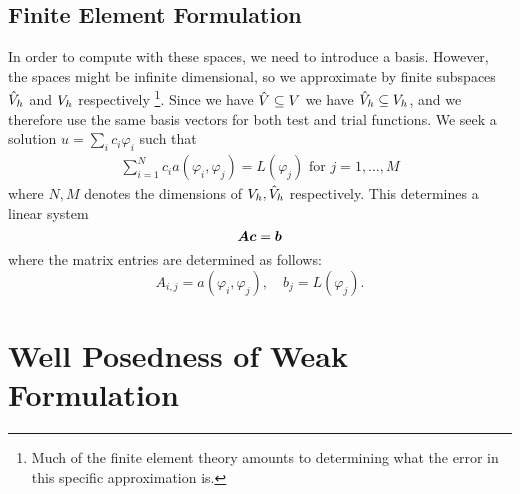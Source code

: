 \subsection{Finite Element Formulation}
\label{sub:finite_element_formulation}

In order to compute with these spaces, we need to introduce a basis. However,
the spaces might be infinite dimensional, so we approximate by finite subspaces
\( \hat{V}_h \) and \(V_h\) respectively%
%
\footnote{Much of the finite element theory amounts to determining what the
error in this specific approximation is.}. %
%
Since we have \( \hat{V} \subseteq V \) we have \( \hat{V}_h \subseteq
V_h \), and we therefore use the same basis vectors for both test and
trial functions. We seek a solution \( u = \sum_i c_i \varphi_i \) such that
\begin{align}
    \sum_{i=1}^{N} c_i a(\varphi_i, \varphi_j) = L(\varphi_j) \text{ for } j = 1, \dots, M
\end{align}
where \(N, M\) denotes the dimensions of \(V_h, \hat{V}_h\) respectively.
This determines a linear system
\begin{equation}
    \boldsymbol{A} \boldsymbol{c} = \boldsymbol{b}
\end{equation}
where the matrix entries are determined as follows:
\begin{equation}
    \label{eq:fem_poisson}
    A_{i, j} = a(\varphi_i, \varphi_j), \quad b_j = L(\varphi_j).
\end{equation}

\section{Well Posedness of Weak Formulation}
\label{sec:well_posedness_of_weak_formulation}

